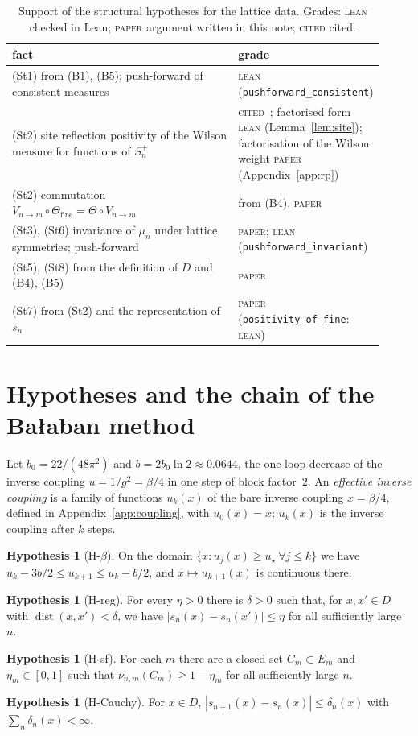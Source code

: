 \documentclass[11pt,a4paper]{article}
\theoremstyle{definition}
\newtheorem{hypothesis}[theorem]{Hypothesis}
\theoremstyle{remark}
\newcommand{\tagL}{\textsc{lean}}
\newcommand{\tagP}{\textsc{paper}}
\newcommand{\tagK}{\textsc{cited}}
\newcommand{\lt}[1]{\texttt{#1}}
\begin{document}
\begin{table}[ht]\centering\small
\caption{Support of the structural hypotheses for the lattice data. Grades: \tagL{} checked in Lean; \tagP{} argument written in this note; \tagK{} cited.}\label{tab:struct}
\begin{tabular}{@{}>{\raggedright\arraybackslash}p{0.62\linewidth}>{\raggedright\arraybackslash}p{0.3\linewidth}@{}}\toprule
fact & grade\\\midrule
(St1) from (B1), (B5); push-forward of consistent measures & \tagL{} (\lt{pushforward\_\allowbreak{}consistent})\\
(St2) site reflection positivity of the Wilson measure for functions of $S_n^+$ & \tagK~\cite{OSe}; factorised form \tagL{} (Lemma~\ref{lem:site}); factorisation of the Wilson weight \tagP{} (Appendix~\ref{app:rp})\\
(St2) commutation $V_{n\to m}\circ\Theta_{\mathrm{fine}}=\Theta\circ V_{n\to m}$ & from (B4), \tagP\\
(St3), (St6) invariance of $\mu_n$ under lattice symmetries; push-forward & \tagP; \tagL{} (\lt{pushforward\_\allowbreak{}invariant})\\
(St5), (St8) from the definition of $D$ and (B4), (B5) & \tagP\\
(St7) from (St2) and the representation of $s_n$ & \tagP{} (\lt{positivity\_\allowbreak{}of\_\allowbreak{}fine}: \tagL)\\\bottomrule
\end{tabular}
\end{table}

\section{Hypotheses and the chain of the Bałaban method}\label{sec:hyp}

Let $b_0=22/(48\pi^2)$ and $b=2b_0\ln2\approx0.0644$, the one-loop decrease of the inverse coupling $u=1/g^2=\beta/4$ in one step of block factor~$2$. An \emph{effective inverse coupling} is a family of functions $u_k(x)$ of the bare inverse coupling $x=\beta/4$, defined in Appendix~\ref{app:coupling}, with $u_0(x)=x$; $u_k(x)$ is the inverse coupling after $k$ steps.

\begin{hypothesis}[H-$\beta$]
On the domain $\{x:u_j(x)\ge u_\star\ \forall j\le k\}$ we have $u_k-3b/2\le u_{k+1}\le u_k-b/2$, and $x\mapsto u_{k+1}(x)$ is continuous there.
\end{hypothesis}
\begin{hypothesis}[H-reg]
For every $\eta>0$ there is $\delta>0$ such that, for $x,x'\in D$ with $\operatorname{dist}(x,x')<\delta$, we have $|s_n(x)-s_n(x')|\le\eta$ for all sufficiently large $n$.
\end{hypothesis}
\begin{hypothesis}[H-sf]
For each $m$ there are a closed set $C_m\subset E_m$ and $\eta_m\in[0,1]$ such that $\nu_{n,m}(C_m)\ge1-\eta_m$ for all sufficiently large $n$.
\end{hypothesis}
\begin{hypothesis}[H-Cauchy]
For $x\in D$, $|s_{n+1}(x)-s_n(x)|\le\delta_n(x)$ with $\sum_n\delta_n(x)<\infty$.
\end{hypothesis}
\end{document}
